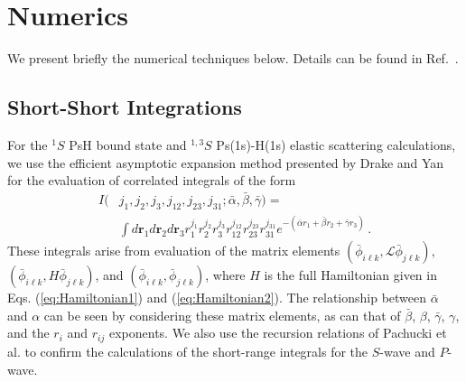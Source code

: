 \documentclass[preprint,showpacs,showkeys,preprintnumbers,amsmath,amssymb,longbibliography,pra,aps]{revtex4-1}
\begin{document}
{\section{Numerics}
\label{sec:Numerical}

We present briefly the numerical techniques below. Details
can be found in Ref.~\cite{WoodsDiss2015}.

\subsection{Short-Short Integrations}
\label{sec:ShortInt}
For the $^1S$ PsH bound state and $^{1,3}S$ Ps(1s)-H(1s) elastic scattering
calculations, we use
the efficient asymptotic expansion method presented by Drake and Yan
\cite{Drake1995} for the evaluation of correlated integrals of the form
\begin{align}
\label{eq:ShortInt}
I(&j_1,j_2,j_3,j_{12},j_{23},j_{31}; \bar{\alpha}, \bar{\beta}, \bar{\gamma}) =
  \nonumber \\
&\int
d \textbf{r}_1 d \textbf{r}_2 d \textbf{r}_3
r_1^{j_1} r_2^{j_2} r_3^{j_3} r_{12}^{j_{12}}
r_{23}^{j_{23}} r_{31}^{j_{31}}
e^{-(\bar{\alpha} r_1 + \bar{\beta} r_2 + \bar{\gamma} r_3)}\, .
\end{align}
These integrals arise from evaluation of the matrix elements
$(\bar{\phi}_{i\ell k}, \mathcal{L} \bar{\phi}_{j\ell k})$,
$(\bar{\phi}_{i\ell k}, H \bar{\phi}_{j\ell k})$,
and $(\bar{\phi}_{i\ell k}, \bar{\phi}_{j\ell k})$, where $H$
is the full Hamiltonian given in Eqs. (\ref{eq:Hamiltonian1}) and
(\ref{eq:Hamiltonian2}).
The relationship between $\bar{\alpha}$ and $\alpha$ can be seen by
considering these matrix elements, as can that of $\bar{\beta}$, $\beta$,
$\bar{\gamma}$, $\gamma$, and the $r_i$ and $r_{ij}$ exponents.
We also use the recursion relations of Pachucki
et al. \cite{Pachucki2004} to confirm the calculations of the short-range 
integrals for the $S$-wave and $P$-wave.

}
\end{document}

